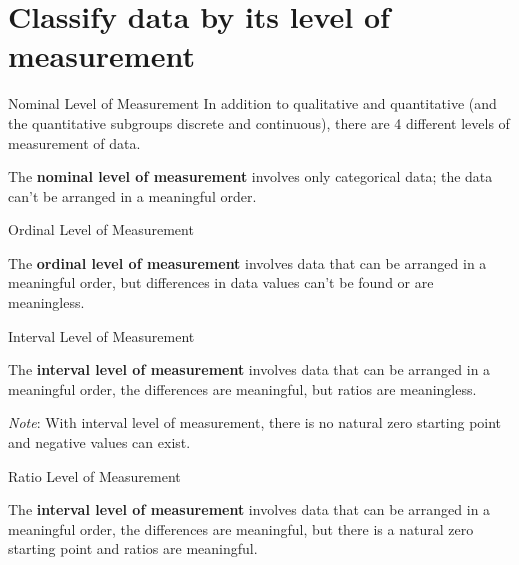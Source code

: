 \documentclass[t]{beamer}
\begin{document}
\section{Classify data by its level of measurement}

\begin{frame}{Nominal Level of Measurement}
In addition to qualitative and quantitative (and the quantitative subgroups discrete and continuous), there are 4 different levels of measurement of data.	\newline\\	\pause
\begin{tcolorbox}[colframe=green!20!black, colback = green!30!white,title=\textbf{Nominal Level of Data}]
The \textbf{nominal level of measurement} involves only categorical data; the data can't be arranged in a meaningful order.
\end{tcolorbox}
\end{frame}

\begin{frame}{Ordinal Level of Measurement}
\begin{tcolorbox}[colframe=green!20!black, colback = green!30!white,title=\textbf{Ordinal Level of Data}]
The \textbf{ordinal level of measurement} involves data that can be arranged in a meaningful order, but differences in data values can't be found or are meaningless.
\end{tcolorbox}
\end{frame}

\begin{frame}{Interval Level of Measurement}
\begin{tcolorbox}[colframe=green!20!black, colback = green!30!white,title=\textbf{Interval Level of Data}]
The \textbf{interval level of measurement} involves data that can be arranged in a meaningful order, the differences are meaningful, but ratios are meaningless.
\end{tcolorbox}
\vspace{10pt}	\pause
\emph{Note}: With interval level of measurement, there is no natural zero starting point and negative values can exist.
\end{frame}

\begin{frame}{Ratio Level of Measurement}
\begin{tcolorbox}[colframe=green!20!black, colback = green!30!white,title=\textbf{Interval Level of Data}]
The \textbf{interval level of measurement} involves data that can be arranged in a meaningful order, the differences are meaningful, but there is a natural zero starting point and ratios are meaningful.
\end{tcolorbox}
\end{frame}
\end{document}
